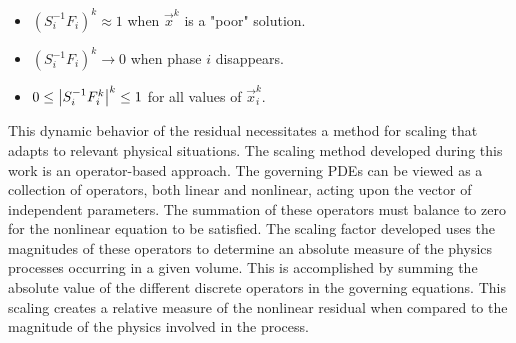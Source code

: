 \begin{itemize}
\item{$(S_{i}^{-1} F_i)^{k} \approx 1$ when $\vec{x}^{k}$ is a "poor" solution.}
\item{$(S_{i}^{-1} F_i)^{k} \rightarrow 0$ when phase $i$ disappears.}
\item{$0 \leq \left|S_{i}^{-1} F^{k}_{i}\right|^{k} \leq 1 $ for all values of $\vec{x}^{k}_i$.}
\end{itemize}

This dynamic behavior of the residual necessitates a method for scaling that adapts to relevant physical situations.
The scaling method developed during this work is an operator-based approach.
The governing PDEs can be viewed as a collection of operators, both linear and nonlinear, acting upon the vector of independent parameters.
The summation of these operators must balance to zero for the nonlinear equation to be satisfied.
The scaling factor developed uses the magnitudes of these operators to determine an absolute measure of the physics processes occurring in a given volume.
This is accomplished by summing the absolute value of the different discrete operators in the governing equations.
This scaling creates a relative measure of the nonlinear residual when compared to the magnitude of the physics involved in the process.


